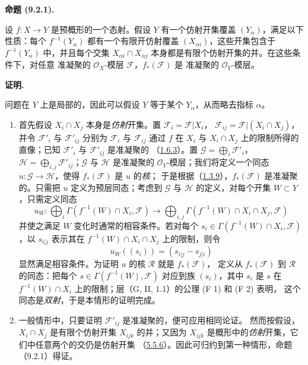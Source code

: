 \documentclass[UTF8,fontset=none,11pt,oneside,openany]{ctexbook}
\newenvironment{proposition}[1][]{%
  \par\medskip\noindent\textbf{命题 (#1).}\ %
}{\par}
\newenvironment{proof}{%
  \par\medskip\noindent\textbf{证明.}\ %
}{\par}
\newcommand{\oldpage}[2][]{%
  \hypertarget{ega-source-page-#1-#2}{}%
  \marginnote{\scriptsize\textbf{#1}~|~#2}\ignorespaces}
\let\EGAOriginalLabel\label
\renewcommand{\label}[1]{\phantomsection\EGAOriginalLabel{#1}}
\begin{document}
\begin{proposition}[9.2.1]
\label{I.9.2.1-fr}
设 $f:X\to Y$ 是预概形的一个态射。假设 $Y$ 有一个仿射开集覆盖
$(Y_\alpha)$，满足以下性质：每个 $f^{-1}(Y_\alpha)$ 都有一个有限开仿射覆盖
$(X_{\alpha i})$，这些开集包含于 $f^{-1}(Y_\alpha)$ 中，并且每个交集
$X_{\alpha i}\cap X_{\alpha j}$ 本身都是有限个仿射开集的并。在这些条件下，对任意
准凝聚的 $\mathscr{O}_X$-模层 $\mathscr{F}$，$f_*(\mathscr{F})$ 是
准凝聚的 $\mathscr{O}_Y$-模层。
\end{proposition}

\begin{proof}
问题在 $Y$ 上是局部的，因此可以假设 $Y$ 等于某个 $Y_\alpha$，从而略去指标 $\alpha$。

\begin{enumerate}
\item[a)] 首先假设 $X_i\cap X_j$ 本身是\emph{仿射}开集。置
$\mathscr{F}_i=\mathscr{F}|X_i$，
$\mathscr{F}_{ij}=\mathscr{F}|(X_i\cap X_j)$，并令
$\mathscr{F}'_i$ 与 $\mathscr{F}'_{ij}$ 分别为 $\mathscr{F}_i$ 与
$\mathscr{F}_{ij}$ 通过 $f$ 在 $X_i$ 与 $X_i\cap X_j$ 上的限制所得的直像；已知
$\mathscr{F}'_i$ 与 $\mathscr{F}'_{ij}$ 是准凝聚的
（\hyperref[I.1.6.3-fr]{1.6.3}）。置
$\mathscr{G}=\bigoplus_i\mathscr{F}'_i$，
$\mathscr{H}=\bigoplus_{i,j}\mathscr{F}'_{ij}$；$\mathscr{G}$ 与
$\mathscr{H}$ 是准凝聚的 $\mathscr{O}_Y$-模层；我们将定义一个同态
$u:\mathscr{G}\to\mathscr{H}$，使得 $f_*(\mathscr{F})$ 是 $u$ 的\emph{核}；
于是根据（\hyperref[I.1.3.9-fr]{1.3.9}），$f_*(\mathscr{F})$ 是准凝聚的。只需把 $u$
\oldpage[I]{172}
定义为预层同态；考虑到 $\mathscr{G}$ 与 $\mathscr{H}$ 的定义，对每个开集
$W\subset Y$，只需定义同态
\[
  u_W:\bigoplus_i\Gamma(f^{-1}(W)\cap X_i,\mathscr{F})
  \longrightarrow
  \bigoplus_{i,j}\Gamma(f^{-1}(W)\cap X_i\cap X_j,\mathscr{F})
\]
并使之满足 $W$ 变化时通常的相容条件。若对每个
$s_i\in\Gamma(f^{-1}(W)\cap X_i,\mathscr{F})$，以 $s_{i|j}$ 表示其在
$f^{-1}(W)\cap X_i\cap X_j$ 上的限制，则令
\[
  u_W((s_i))=(s_{i|j}-s_{j|i})
\]
显然满足相容条件。为证明 $u$ 的核 $\mathscr{R}$ 就是 $f_*(\mathscr{F})$，
定义从 $f_*(\mathscr{F})$ 到 $\mathscr{R}$ 的同态：把每个
$s\in\Gamma(f^{-1}(W),\mathscr{F})$ 对应到族 $(s_i)$，其中 $s_i$ 是 $s$ 在
$f^{-1}(W)\cap X_i$ 上的限制；层（G, II, 1.1）的公理 (F 1) 和 (F 2) 表明，
这个同态是\emph{双射}，于是本情形的证明完成。

\item[b)] 一般情形中，只要证明 $\mathscr{F}'_{ij}$ 是准凝聚的，便可应用相同论证。
然而按假设，$X_i\cap X_j$ 是有限个仿射开集 $X_{ijk}$ 的并；又因为
$X_{ijk}$ 是概形中的\emph{仿射}开集，它们中任意两个的交仍是仿射开集
（\hyperref[I.5.5.6-fr]{5.5.6}）。因此可归约到第一种情形，命题（9.2.1）得证。
\end{enumerate}
\end{proof}
\end{document}
